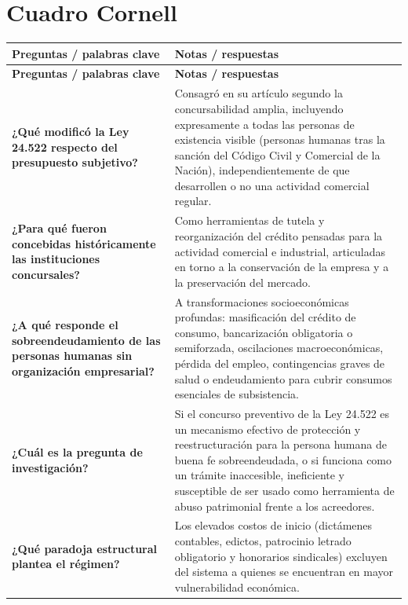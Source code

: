 \documentclass[12pt,oneside]{book}
\begin{document}
\section{Cuadro Cornell}

\begin{longtable}{
    >{\raggedright\arraybackslash}p{}
    >{\raggedright\arraybackslash}p{}
}
\toprule
\textbf{Preguntas / palabras clave} & \textbf{Notas / respuestas} \\
\midrule
\endfirsthead
\toprule
\textbf{Preguntas / palabras clave} & \textbf{Notas / respuestas} \\
\midrule
\endhead
\bottomrule
\endfoot

\textbf{¿Qué modificó la Ley 24.522 respecto del presupuesto subjetivo?} &
Consagró en su artículo segundo la concursabilidad amplia, incluyendo expresamente a todas las personas de existencia visible (personas humanas tras la sanción del Código Civil y Comercial de la Nación), independientemente de que desarrollen o no una actividad comercial regular. \\[0.6em]

\textbf{¿Para qué fueron concebidas históricamente las instituciones concursales?} &
Como herramientas de tutela y reorganización del crédito pensadas para la actividad comercial e industrial, articuladas en torno a la conservación de la empresa y a la preservación del mercado. \\[0.6em]

\textbf{¿A qué responde el sobreendeudamiento de las personas humanas sin organización empresarial?} &
A transformaciones socioeconómicas profundas: masificación del crédito de consumo, bancarización obligatoria o semiforzada, oscilaciones macroeconómicas, pérdida del empleo, contingencias graves de salud o endeudamiento para cubrir consumos esenciales de subsistencia. \\[0.6em]

\textbf{¿Cuál es la pregunta de investigación?} &
Si el concurso preventivo de la Ley 24.522 es un mecanismo efectivo de protección y reestructuración para la persona humana de buena fe sobreendeudada, o si funciona como un trámite inaccesible, ineficiente y susceptible de ser usado como herramienta de abuso patrimonial frente a los acreedores. \\[0.6em]

\textbf{¿Qué paradoja estructural plantea el régimen?} &
Los elevados costos de inicio (dictámenes contables, edictos, patrocinio letrado obligatorio y honorarios sindicales) excluyen del sistema a quienes se encuentran en mayor vulnerabilidad económica. \\[0.6em]


\end{longtable}
\end{document}

